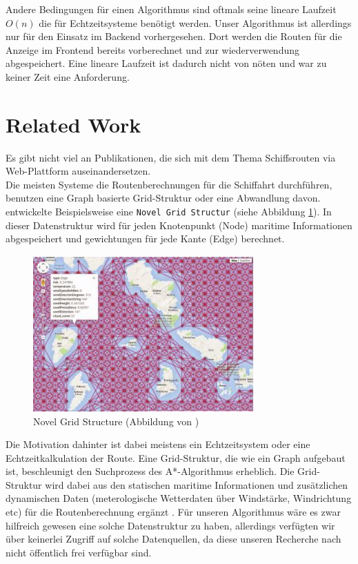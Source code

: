 \documentclass[letterpaper]{article}
\begin{document}
	Andere Bedingungen für einen Algorithmus sind oftmals seine lineare Laufzeit $O(n)$ die für Echtzeitsysteme benötigt werden. Unser Algorithmus ist allerdings nur für den Einsatz im Backend vorhergesehen. Dort werden die Routen für die Anzeige im Frontend bereits vorberechnet und zur wiederverwendung abgespeichert. Eine lineare Laufzeit ist dadurch nicht von nöten und war zu keiner Zeit eine Anforderung.

\section{Related Work}
	Es gibt nicht viel an Publikationen, die sich mit dem Thema Schiffsrouten via Web-Plattform auseinandersetzen.\\

	Die meisten Systeme die Routenberechnungen für die Schiffahrt durchführen, benutzen eine Graph basierte Grid-Struktur oder eine Abwandlung davon. \cite{makrygiorgos15} entwickelte Beispielsweise eine \texttt{Novel Grid Structur} (siehe Abbildung \ref{fig:novel grid structure}). In dieser Datenstruktur wird für jeden Knotenpunkt (Node) maritime Informationen abgespeichert und gewichtungen für jede Kante (Edge) berechnet.

	\begin{figure}[!htbp]
		\centering
		\includegraphics[width=.8\linewidth]{novel_grid_structure}
		\caption{Novel Grid Structure (Abbildung von \cite{makrygiorgos15})}
		\label{fig:novel grid structure}
	\end{figure}

	Die Motivation dahinter ist dabei meistens ein Echtzeitsystem oder eine Echtzeitkalkulation der Route. Eine Grid-Struktur, die wie ein Graph aufgebaut ist, beschleunigt den Suchprozess des A*-Algorithmus erheblich\cite{patel16}. Die Grid-Struktur wird dabei aus den statischen maritime Informationen und zusätzlichen dynamischen Daten (meterologische Wetterdaten über Windstärke, Windrichtung etc) für die Routenberechnung ergänzt \cite[s. 2]{makrygiorgos15}.
	Für unseren Algorithmus wäre es zwar hilfreich gewesen eine solche Datenstruktur zu haben, allerdings verfügten wir über keinerlei Zugriff auf solche Datenquellen, da diese unseren Recherche nach nicht öffentlich frei verfügbar sind.
\end{document}
